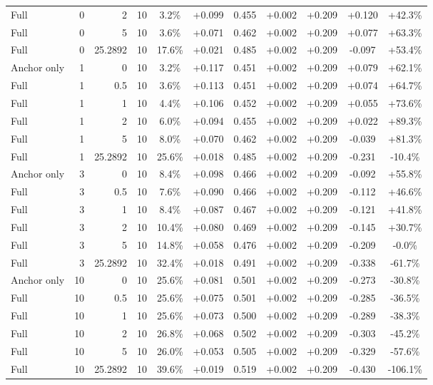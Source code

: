 \begin{table}[htbp]
\begin{tabular}{lrrrccccccc}
Full & 0 & 2 & 10 & 3.2\% & +0.099 & 0.455 & +0.002 & +0.209 & +0.120 & +42.3\% \\
Full & 0 & 5 & 10 & 3.6\% & +0.071 & 0.462 & +0.002 & +0.209 & +0.077 & +63.3\% \\
Full & 0 & 25.2892 & 10 & 17.6\% & +0.021 & 0.485 & +0.002 & +0.209 & -0.097 & +53.4\% \\
Anchor only & 1 & 0 & 10 & 3.2\% & +0.117 & 0.451 & +0.002 & +0.209 & +0.079 & +62.1\% \\
Full & 1 & 0.5 & 10 & 3.6\% & +0.113 & 0.451 & +0.002 & +0.209 & +0.074 & +64.7\% \\
Full & 1 & 1 & 10 & 4.4\% & +0.106 & 0.452 & +0.002 & +0.209 & +0.055 & +73.6\% \\
Full & 1 & 2 & 10 & 6.0\% & +0.094 & 0.455 & +0.002 & +0.209 & +0.022 & +89.3\% \\
Full & 1 & 5 & 10 & 8.0\% & +0.070 & 0.462 & +0.002 & +0.209 & -0.039 & +81.3\% \\
Full & 1 & 25.2892 & 10 & 25.6\% & +0.018 & 0.485 & +0.002 & +0.209 & -0.231 & -10.4\% \\
Anchor only & 3 & 0 & 10 & 8.4\% & +0.098 & 0.466 & +0.002 & +0.209 & -0.092 & +55.8\% \\
Full & 3 & 0.5 & 10 & 7.6\% & +0.090 & 0.466 & +0.002 & +0.209 & -0.112 & +46.6\% \\
Full & 3 & 1 & 10 & 8.4\% & +0.087 & 0.467 & +0.002 & +0.209 & -0.121 & +41.8\% \\
Full & 3 & 2 & 10 & 10.4\% & +0.080 & 0.469 & +0.002 & +0.209 & -0.145 & +30.7\% \\
Full & 3 & 5 & 10 & 14.8\% & +0.058 & 0.476 & +0.002 & +0.209 & -0.209 & -0.0\% \\
Full & 3 & 25.2892 & 10 & 32.4\% & +0.018 & 0.491 & +0.002 & +0.209 & -0.338 & -61.7\% \\
Anchor only & 10 & 0 & 10 & 25.6\% & +0.081 & 0.501 & +0.002 & +0.209 & -0.273 & -30.8\% \\
Full & 10 & 0.5 & 10 & 25.6\% & +0.075 & 0.501 & +0.002 & +0.209 & -0.285 & -36.5\% \\
Full & 10 & 1 & 10 & 25.6\% & +0.073 & 0.500 & +0.002 & +0.209 & -0.289 & -38.3\% \\
Full & 10 & 2 & 10 & 26.8\% & +0.068 & 0.502 & +0.002 & +0.209 & -0.303 & -45.2\% \\
Full & 10 & 5 & 10 & 26.0\% & +0.053 & 0.505 & +0.002 & +0.209 & -0.329 & -57.6\% \\
Full & 10 & 25.2892 & 10 & 39.6\% & +0.019 & 0.519 & +0.002 & +0.209 & -0.430 & -106.1\% \\

\end{tabular}
\end{table}
